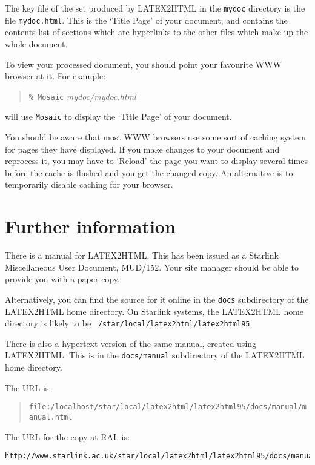 \documentclass[twoside,11pt]{article}
\newcommand{\htmladdnormallink}[2]{#1}
\newcommand{\xlabel}[1]{}
\begin{document}
The key file of the set produced by LATEX2HTML in the {\tt mydoc}
directory is the file {\tt mydoc.html}.  This is the `Title Page' of
your document, and contains the contents list of sections which are
hyperlinks to the other files which make up the whole document.

To view your processed document, you should point your favourite WWW
browser at it.  For example:

\begin{quote}
{\tt \% Mosaic} {\it mydoc/mydoc.html}
\end{quote}

will use {\tt Mosaic} to display the `Title Page' of your document.

You should be aware that most WWW browsers use some sort of caching
system for pages they have displayed.  If you make changes to your
document and reprocess it, you may have to `Reload' the page you want to
display several times before the cache is flushed and you get the
changed copy.  An alternative is to temporarily disable caching for
your browser.

\section{Further information\xlabel{further_information}}

There is a manual for LATEX2HTML.  This has been issued as a Starlink
Miscellaneous User Document, MUD/152.  Your site manager should be able
to provide you with a paper copy.  

Alternatively, you can find the source for it online in the {\tt docs}
subdirectory of the LATEX2HTML home directory.  On Starlink systems,
the LATEX2HTML home directory is likely to be {\tt
/star/\-local/latex2html/latex2html95}.

There is also a hypertext version of the same manual, created using
LATEX2HTML.  This is in the {\tt docs/manual} subdirectory of the
LATEX2HTML home directory.  

The URL is:

\begin{quote}
{\small
{\tt file:/localhost/star/local/latex2html/latex2html95/docs/manual/manual.html}
}
\end{quote}

The URL for the
\htmladdnormallink{copy at RAL}
{http://www.starlink.ac.uk/star/local/latex2html/latex2html95/docs/manual/manual.html}
is:

{\small
\begin{verbatim}
http://www.starlink.ac.uk/star/local/latex2html/latex2html95/docs/manual/manual.html
\end{verbatim}
}
\end{document}
